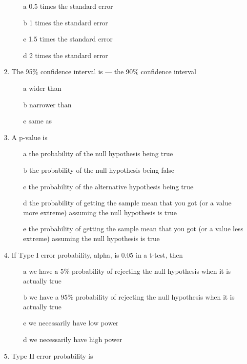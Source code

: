 \documentclass[12pt]{book}
\begin{document}
\begin{enumerate}
\begin{enumerate}
\item[a]
 0.5 times the standard error
\item[b]
 1 times the standard error
\item[c]
1.5 times the standard error
\item[d]
2 times the standard error
\end{enumerate}

\item
The 95\% confidence interval is --- the 90\% confidence interval

\begin{enumerate}
\item[a]
wider than
\item[b]
narrower than
\item[c]
same as
\end{enumerate}

\item
A p-value is

\begin{enumerate}
\item[a]
the probability of the null hypothesis being true
\item[b]
the probability of the null hypothesis being false
\item[c]
the probability of the alternative hypothesis being true
\item[d]
the probability of getting the sample mean that you got (or a value more extreme) assuming the null hypothesis is true
\item[e]
the probability of getting the sample mean that you got (or a value less extreme) assuming the null hypothesis is true
\end{enumerate}

\item
If Type I error probability, alpha, is 0.05 in a t-test, then

\begin{enumerate}
\item[a]
we have a 5\% probability of rejecting the null hypothesis when it is actually true
\item[b]
we have a 95\% probability of rejecting the null hypothesis when it is actually true
\item[c]
we necessarily have low power
\item[d]
we necessarily have high power
\end{enumerate}

\item
Type II error probability is


\end{enumerate}
\end{document}
